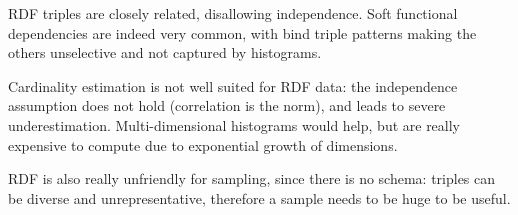 
RDF triples are closely related, disallowing independence. Soft functional dependencies are indeed very common, with bind triple patterns making the others unselective and not captured by histograms.

Cardinality estimation is not well suited for RDF data: the independence assumption does not hold (correlation is the norm), and leads to severe underestimation. Multi-dimensional histograms would help, but are really expensive to compute due to exponential growth of dimensions.

RDF is also really unfriendly for sampling, since there is no schema: triples can be diverse and unrepresentative, therefore a sample needs to be huge to be useful.



